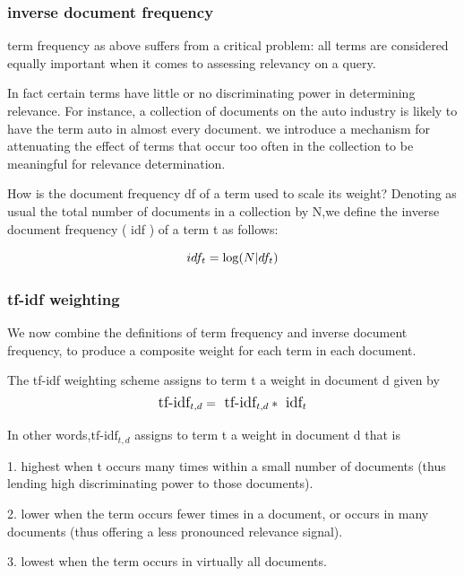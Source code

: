 \subsubsection{inverse document frequency}

term frequency as above suffers from a critical problem: all terms are
considered equally important when it comes to assessing relevancy on a
query. 

In fact certain terms have little or no discriminating power in determining
relevance. For instance, a collection of documents on the auto
industry is likely to have the term auto in almost every document.
we introduce a mechanism for attenuating the effect of terms that occur
too often in the collection to be meaningful for relevance determination.


How is the document frequency df of a term used to scale its weight? 
Denoting as usual the total number of documents in a collection by N,we define the inverse document frequency ( idf ) of a term t as follows:

\begin{equation}
        \large 
            idf_{t} = \log (N | df_{t})\end{equation}

\subsubsection{tf-idf weighting}

We now combine the definitions of term frequency and inverse document
frequency, to produce a composite weight for each term in each document.

The tf-idf weighting scheme assigns to term t a weight in document d given by
\begin{equation}
    \large
     \text{tf-idf}_{t,d} =\text{ tf-idf}_{t,d } *\text{ idf}_{t} \end{equation}  
     
In other words,$\text{tf-idf}_{t,d}$  assigns to term t a weight in document d that is

1. highest when t occurs many times within a small number of documents
(thus lending high discriminating power to those documents).

2. lower when the term occurs fewer times in a document, or occurs in many
documents (thus offering a less pronounced relevance signal).

3. lowest when the term occurs in virtually all documents.     

